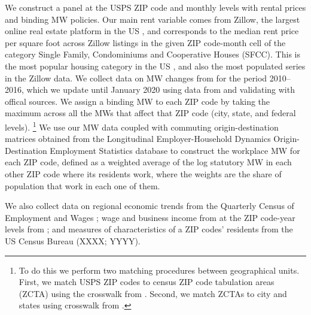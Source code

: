 We construct a panel at the USPS ZIP code and monthly levels with rental prices 
and binding MW policies.
Our main rent variable comes from Zillow, the largest online real estate platform 
in the US \parencite{realestateagentpdx, investopedia}, and corresponds to the 
median rent price per square foot across Zillow listings in the given ZIP code-month 
cell of the category Single Family, Condominiums and Cooperative Houses (SFCC). 
This is the most popular housing category in the US \parencite{Fernald2020}, 
and also the most populated series in the Zillow data.
We collect data on MW changes from \textcite{VaghulZipperer2016} for the period 
2010--2016, which we update until January 2020 using data from 
\textcite{BerkeleyLaborCenter} and validating with offical sources.
We assign a binding MW to each ZIP code by taking the maximum across all the
MWs that affect that ZIP code (city, state, and federal levels).%
\footnote{To do this we perform two matching procedures between geographical units.
First, we match USPS ZIP codes to census ZIP code tabulation areas (ZCTA) using 
the crosswalk from \textcite{UDSMapper}.
Second, we match ZCTAs to city and states using crosswalk from 
\textcite{MissouriCenter}.}
We use our MW data coupled with commuting origin-destination matrices obtained from 
the Longitudinal Employer-Household Dynamics Origin-Destination Employment 
Statistics \textcite[LODES;][]{LODES} database to construct the workplace MW for 
each ZIP code, defined as a weighted average of the log statutory MW in each other 
ZIP code where its residents work, where the weights are the share of population 
that work in each one of them.

We also collect data on 
regional economic trends from the Quarterly Census of Employment and Wages 
\textcite[QCEW;][]{QCEW}; 
wage and business income from at the ZIP code-year levels from \textcite{IRS}; and 
measures of characteristics of a ZIP codes' residents from the US Census Bureau 
(XXXX; YYYY).


